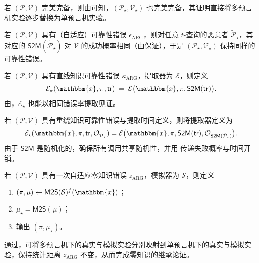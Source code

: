 \documentclass[american,singlepageview]{snargs-book-zh}
\newcommand{\Malicious}[1]{\tilde{#1}}
\newcommand{\BlackBox}[1]{\mathcal{O}_{#1}}
\newcommand{\Instance}{\mathbbm{x}}
\newcommand{\ProtoProver}{P}
\newcommand{\ProtoVerifier}{V}
\newcommand{\ProtoExtractor}{E}
\newcommand{\ProtoSimulator}{S}
\newcommand{\ProtoSoundnessError}{\epsilon}
\newcommand{\ProtoKnowledgeError}{\kappa}
\newcommand{\ProtoZKError}{z}
\newcommand{\ARGSubscript}{\scriptscriptstyle\mathrm{ARG}}
\newcommand{\ARGFormat}[1]{\mathcal{#1}}
\newcommand{\ARGProver}{\ARGFormat{\ProtoProver}}
\newcommand{\ARGVerifier}{\ARGFormat{\ProtoVerifier}}
\newcommand{\ARGExtractor}{\ARGFormat{\ProtoExtractor}}
\newcommand{\ARGSimulator}{\ARGFormat{\ProtoSimulator}}
\newcommand{\ARGString}{\pi}
\newcommand{\ARGSoundnessError}{\ProtoSoundnessError_{\ARGSubscript}}
\newcommand{\ARGKnowledgeError}{\ProtoKnowledgeError_{\ARGSubscript}}
\newcommand{\ARGOAZKError}{\ProtoZKError_{\ARGSubscript}}
\newcommand{\ARGZKProgrammedList}{\ProgrammedList}
\newcommand{\ROFunction}{f}
\newcommand{\ROQueryBound}{t}
\newcommand{\ROTrace}{\mathsf{tr}}
\newcommand{\MultiToSingle}{\mathsf{M2S}}
\newcommand{\SingleToMulti}{\mathsf{S2M}}
\newcommand{\ProgrammedList}{\mu}
\begin{document}
若 $(\ARGProver,\ARGVerifier)$ 完美完备，则由可知，$(\ARGProver_{\star},\ARGVerifier_{\star})$ 也完美完备，其证明直接将多预言机实验逐步替换为单预言机实验。

若 $(\ARGProver,\ARGVerifier)$ 具有（自适应）可靠性错误 $\ARGSoundnessError$，则对任意 $\ROQueryBound$-查询的恶意者 $\Malicious{\ARGProver}_{\star}$，其对应的 $\SingleToMulti(\Malicious{\ARGProver}_{\star})$ 对 $\ARGVerifier$ 的成功概率相同（由保证），于是
$(\ARGProver_{\star},\ARGVerifier_{\star})$ 保持同样的可靠性错误。

若 $(\ARGProver,\ARGVerifier)$ 具有直线知识可靠性错误 $\ARGKnowledgeError$，提取器为 $\ARGExtractor$，则定义
\[
  \ARGExtractor_{\star}(\Instance,\ARGString,\ROTrace)
  \;=\;
  \ARGExtractor\bigl(\Instance,\ARGString,\SingleToMulti(\ROTrace)\bigr).
\]
由，$\ARGExtractor_{\star}$ 也能以相同错误率提取见证。

若 $(\ARGProver,\ARGVerifier)$ 具有重绕知识可靠性错误与提取时间定义，则将提取器定义为
\[
  \ARGExtractor_{\star}(\Instance,\ARGString,\ROTrace,\BlackBox{\Malicious{\ARGProver}_{\star}})
  = 
  \ARGExtractor\bigl(\Instance,\ARGString,\SingleToMulti(\ROTrace),\BlackBox{\SingleToMulti(\Malicious{\ARGProver}_{\star})}\bigr).
\]
由于 $\SingleToMulti$ 是随机化的，确保所有调用共享随机性，并用 传递失败概率与时间开销。

若 $(\ARGProver,\ARGVerifier)$ 具有一次自适应零知识错误 $\ARGOAZKError$，模拟器为 $\ARGSimulator$，则定义
\begin{enumerate}[noitemsep]
  \item $(\ARGString,\ARGZKProgrammedList)
        \gets \MultiToSingle(\ARGSimulator)^{\ROFunction}(\Instance)$；
  \item $\ARGZKProgrammedList_{\star}
        = \MultiToSingle(\ARGZKProgrammedList)$；
  \item 输出 $(\ARGString,\ARGZKProgrammedList_{\star})$。
\end{enumerate}
通过，可将多预言机下的真实与模拟实验分别映射到单预言机下的真实与模拟实验，保持统计距离 $\ARGOAZKError$ 不变，从而完成零知识的继承论证。


\end{document}
